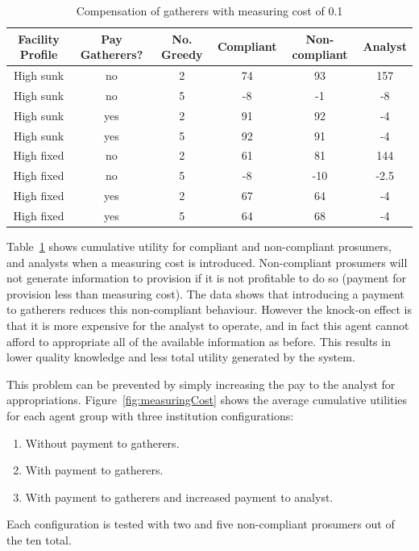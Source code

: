 \begin{table}
\centering
\begin{tabular}{c|c|c||c|c|c}
Facility Profile & Pay Gatherers? & No. Greedy & Compliant & Non-compliant & Analyst \\ 
\hline \hline
High sunk & no & 2 & 74 & 93 & 157 \\ 
\hline 
High sunk & no & 5 & -8 & -1 & -8 \\ 
\hline
High sunk & yes & 2 & 91 & 92 & -4 \\ 
\hline 
High sunk & yes & 5 & 92 & 91 & -4 \\ 
\hline  
High fixed & no & 2 & 61 & 81 & 144 \\ 
\hline 
High fixed & no & 5 & -8 & -10 & -2.5 \\ 
\hline
High fixed & yes & 2 & 67 & 64 & -4 \\ 
\hline 
High fixed & yes & 5 & 64 & 68 & -4 \\ 
\end{tabular}
\caption{Compensation of gatherers with measuring cost of 0.1}\label{tab:gatherers1}
\end{table} 

Table~\ref{tab:gatherers1} shows cumulative utility for compliant and non-compliant prosumers, and analysts when a measuring cost is introduced. Non-compliant prosumers will not generate information to provision if it is not profitable to do so (payment for provision less than measuring cost). The data shows that introducing a payment to gatherers reduces this non-compliant behaviour. However the knock-on effect is that it is more expensive for the analyst to operate, and in fact this agent cannot afford to appropriate all of the available information as before. This results in lower quality knowledge and less total utility generated by the system.

This problem can be prevented by simply increasing the pay to the analyst for appropriations. Figure~\ref{fig:measuringCost} shows the average cumulative utilities for each agent group with three institution configurations:
\begin{enumerate}
\item Without payment to gatherers.
\item With payment to gatherers.
\item With payment to gatherers and increased payment to analyst.
\end{enumerate}
Each configuration is tested with two and five non-compliant prosumers out of the ten total.

